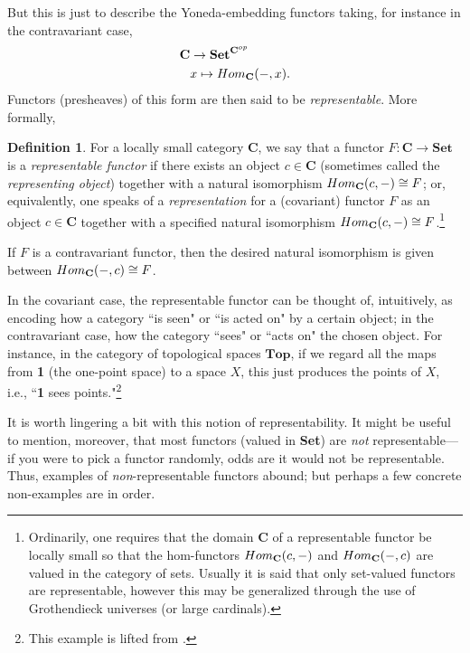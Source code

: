 \documentclass[11pt]{book}
\theoremstyle{definition}
\theoremstyle{definition}
\newtheorem{definition}{Definition}[section]
\theoremstyle{definition}
\theoremstyle{theorem}
\theoremstyle{definition}
\begin{document}
But this is just to describe the Yoneda-embedding functors taking, for instance in the contravariant case, 
\begin{align*}
\textbf{C} & \rightarrow \textbf{Set}^{\textbf{C}^{op}} \\ 
& x \mapsto Hom_{\textbf{C}}(\--, x). 
\end{align*}
Functors (presheaves) of this form are then said to be \textit{representable}. More formally, 
\begin{definition} 
	For a locally small category $\textbf{C}$, we say that a functor $F:\textbf{C} \rightarrow \textbf{Set}$ is a \textit{representable functor}  if there exists an object $c \in \textbf{C}$ (sometimes called the \textit{representing object}) together with a natural isomorphism $Hom_{\textbf{C}}(c, \--) \cong F$; or, equivalently, one speaks of a \textit{representation} for a (covariant) functor $F$ as an object $c \in \textbf{C}$ together with a specified natural isomorphism $Hom_{\textbf{C}}(c, \--) \cong F$.\footnote{Ordinarily, one requires that the domain \textbf{C} of a representable functor be locally small so that the hom-functors $Hom_{\textbf{C}}(c, \--)$ and $Hom_{\textbf{C}}(\--, c)$ are valued in the category of sets. Usually it is said that only set-valued functors are representable, however this may be generalized through the use of Grothendieck universes (or large cardinals).} \par 
	If $F$ is a contravariant functor, then the desired natural isomorphism is given between $Hom_{\textbf{C}}(\--, c) \cong F$.
\end{definition}
 In the covariant case, the representable functor can be thought of, intuitively, as encoding how a category ``is seen" or ``is acted on" by a certain object; in the contravariant case, how the category ``sees" or ``acts on" the chosen object. For instance, in the category of topological spaces $\textbf{Top}$, if we regard all the maps from \textbf{1} (the one-point space) to a space $X$, this just produces the points of $X$, i.e., ``\textbf{1} sees points."\footnote{This example is lifted from \cite{leinster_basic_2014}.} \par 
It is worth lingering a bit with this notion of representability. It might be useful to mention, moreover, that most functors (valued in \textbf{Set}) are \textit{not} representable---if you were to pick a functor randomly, odds are it would not be representable. Thus, examples of \textit{non}-representable functors abound; but perhaps a few concrete non-examples are in order. 
\end{document}

